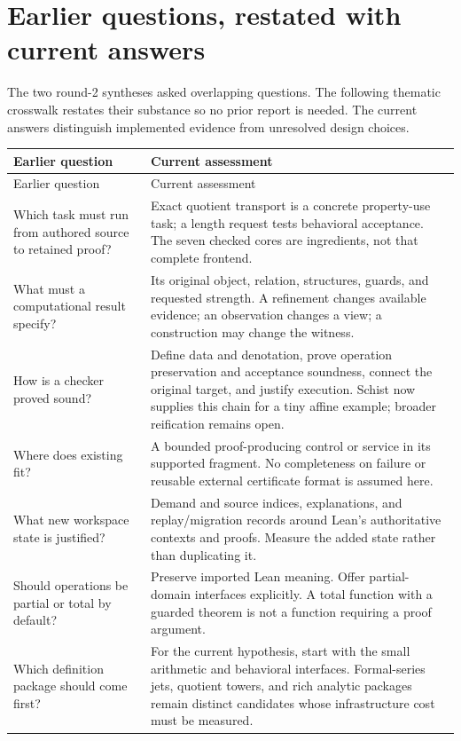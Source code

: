 \documentclass[11pt,letterpaper]{article}
\newcommand{\code}[1]{\texttt{\detokenize{#1}}}
\theoremstyle{definition}\newtheorem{definition}[proposition]{Definition}
\theoremstyle{remark}\newtheorem{remark}[proposition]{Remark}
\begin{document}
\section{Earlier questions, restated with current answers}\label{app:earlier}
The two round-2 syntheses asked overlapping questions. The following thematic
crosswalk restates their substance so no prior report is needed. The current
answers distinguish implemented evidence from unresolved design choices.
\begin{center}\small
\begin{longtable}{@{}P{0.30\textwidth}P{0.62\textwidth}@{}}
\toprule Earlier question & Current assessment\\\midrule\endfirsthead
\toprule Earlier question & Current assessment\\\midrule\endhead
\bottomrule\endfoot
Which task must run from authored source to retained proof? & Exact quotient transport is a concrete property-use task; a length request tests behavioral acceptance. The seven checked cores are ingredients, not that complete frontend.\\
What must a computational result specify? & Its original object, relation, structures, guards, and requested strength. A refinement changes available evidence; an observation changes a view; a construction may change the witness.\\
How is a checker proved sound? & Define data and denotation, prove operation preservation and acceptance soundness, connect the original target, and justify execution. Schist now supplies this chain for a tiny affine example; broader reification remains open.\\
Where does existing \code{grobner} fit? & A bounded proof-producing control or service in its supported fragment. No completeness on failure or reusable external certificate format is assumed here.\\
What new workspace state is justified? & Demand and source indices, explanations, and replay/migration records around Lean's authoritative contexts and proofs. Measure the added state rather than duplicating it.\\
Should operations be partial or total by default? & Preserve imported Lean meaning. Offer partial-domain interfaces explicitly. A total function with a guarded theorem is not a function requiring a proof argument.\\
Which definition package should come first? & For the current hypothesis, start with the small arithmetic and behavioral interfaces. Formal-series jets, quotient towers, and rich analytic packages remain distinct candidates whose infrastructure cost must be measured.\\

\end{longtable}
\end{center}
\end{document}
